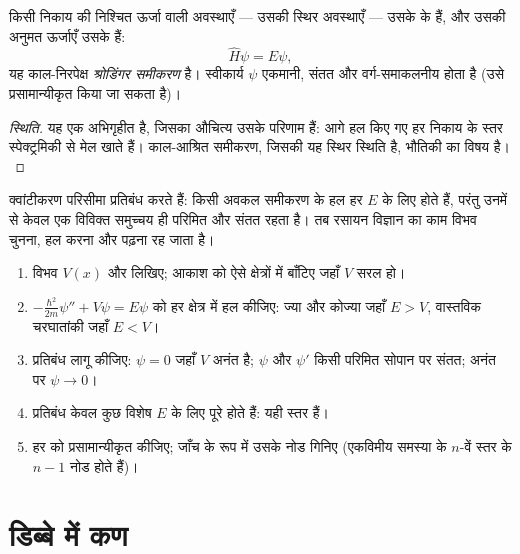 \begin{theorem}[श्रोडिंगर समीकरण]\label{thm:b3:quantum-model-systems:schrodinger}
किसी निकाय की निश्चित ऊर्जा वाली अवस्थाएँ --- उसकी स्थिर अवस्थाएँ --- उसके
 के  हैं, और उसकी अनुमत ऊर्जाएँ उसके  हैं:
\[
\hat H\psi = E\psi,
\]
यह काल-निरपेक्ष \emph{श्रोडिंगर समीकरण} है।
स्वीकार्य $\psi$ एकमानी, संतत और
वर्ग-समाकलनीय होता है (उसे प्रसामान्यीकृत किया जा सकता है)।
\end{theorem}
\begin{proof}[स्थिति]
यह एक अभिगृहीत है, जिसका औचित्य उसके परिणाम हैं: आगे हल किए गए हर निकाय के
स्तर स्पेक्ट्रमिकी से मेल खाते हैं। काल-आश्रित समीकरण, जिसकी यह स्थिर
स्थिति है, भौतिकी का विषय है।
\end{proof}

क्वांटीकरण परिसीमा प्रतिबंध करते हैं: किसी अवकल समीकरण के हल हर
$E$ के लिए होते हैं, परंतु उनमें से केवल एक विविक्त समुच्चय ही परिमित और संतत
रहता है। तब रसायन विज्ञान का काम विभव चुनना, हल करना और  पढ़ना
रह जाता है।

\begin{method}\label{met:b3:quantum-model-systems:one-dimensional}
\begin{enumerate}
  \item विभव $V(x)$ और  लिखिए; आकाश को ऐसे
        क्षेत्रों में बाँटिए जहाँ $V$ सरल हो।
  \item $-\frac{\hbar^2}{2m}\psi'' + V\psi = E\psi$ को हर क्षेत्र में हल कीजिए: ज्या
        और कोज्या जहाँ $E > V$, वास्तविक चरघातांकी जहाँ $E < V$।
  \item प्रतिबंध लागू कीजिए: $\psi = 0$ जहाँ $V$ अनंत है; $\psi$
        और $\psi'$ किसी परिमित सोपान पर संतत; अनंत पर $\psi \to 0$।
  \item प्रतिबंध केवल कुछ विशेष $E$ के लिए पूरे होते हैं: यही स्तर हैं।
  \item हर  को प्रसामान्यीकृत कीजिए; जाँच के रूप में उसके नोड गिनिए
        (एकविमीय समस्या के $n$-वें स्तर के $n - 1$ नोड होते हैं)।
\end{enumerate}
\end{method}

\section{डिब्बे में कण}

